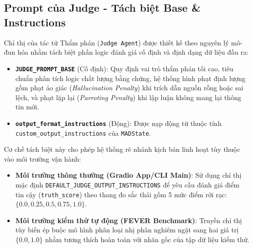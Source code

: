 \documentclass[12pt,a4paper]{report}
\begin{document}
\subsection{Prompt của Judge - Tách biệt Base \& Instructions}
Chỉ thị của tác tử Thẩm phán (\texttt{Judge Agent}) được thiết kế theo nguyên lý mô-đun hóa nhằm tách biệt phần logic đánh giá cố định và định dạng dữ liệu đầu ra:
\begin{itemize}
    \item \textbf{\texttt{JUDGE\_PROMPT\_BASE}} (Cố định): Quy định vai trò thẩm phán tối cao, tiêu chuẩn phân tích logic chất lượng bằng chứng, hệ thống hình phạt định lượng gồm phạt ảo giác (\textit{Hallucination Penalty}) khi trích dẫn nguồn rỗng hoặc sai lệch, và phạt lặp lại (\textit{Parroting Penalty}) khi lập luận không mang lại thông tin mới.
    \item \textbf{\texttt{output\_format\_instructions}} (Động): Được nạp động từ thuộc tính \texttt{custom\_output\_instructions} của \texttt{MADState}.
\end{itemize}

Cơ chế tách biệt này cho phép hệ thống rẽ nhánh kịch bản linh hoạt tùy thuộc vào môi trường vận hành:
\begin{itemize}
    \item \textbf{Môi trường thông thường (Gradio App/CLI Main)}: Sử dụng chỉ thị mặc định \texttt{DEFAULT\_JUDGE\_OUTPUT\_INSTRUCTIONS} để yêu cầu đánh giá điểm tin cậy (\texttt{truth\_score}) theo thang đo sắc thái gồm 5 mức điểm rời rạc: $\{0.0, 0.25, 0.5, 0.75, 1.0\}$.
    \item \textbf{Môi trường kiểm thử tự động (FEVER Benchmark)}: Truyền chỉ thị tùy biến ép buộc mô hình phân loại nhị phân nghiêm ngặt sang hai giá trị $\{0.0, 1.0\}$ nhằm tương thích hoàn toàn với nhãn gốc của tập dữ liệu kiểm thử.
\end{itemize}
\end{document}
